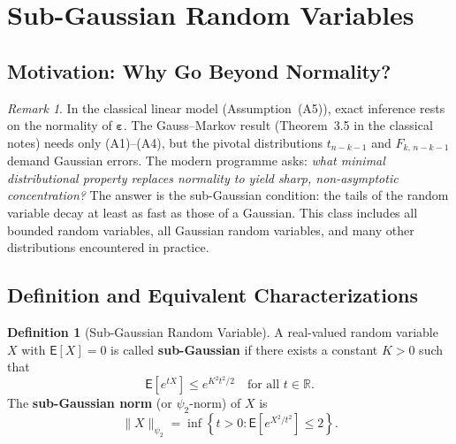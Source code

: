 \documentclass[14pt]{extarticle}
\theoremstyle{plain}
\theoremstyle{definition}
\newtheorem{definition}{Definition}[section]
\theoremstyle{remark}
\newtheorem*{remark}{Remark}
\newcommand\expc{\mathsf{E}}
\newcommand{\be}{\boldsymbol{\varepsilon}}
\newcommand{\Real}{\mathbb{R}}
\begin{document}
\section{Sub-Gaussian Random Variables}\label{sec:subgaussian}

\subsection{Motivation: Why Go Beyond Normality?}

\begin{remark}
In the classical linear model (Assumption~(A5)), exact inference rests on the normality of $\be$. The Gauss--Markov result (Theorem~3.5 in the classical notes) needs only (A1)--(A4), but the pivotal distributions $t_{n-k-1}$ and $F_{k,\,n-k-1}$ demand Gaussian errors. The modern programme asks: \emph{what minimal distributional property replaces normality to yield sharp, non-asymptotic concentration?} The answer is the sub-Gaussian condition: the tails of the random variable decay at least as fast as those of a Gaussian. This class includes all bounded random variables, all Gaussian random variables, and many other distributions encountered in practice.
\end{remark}

\subsection{Definition and Equivalent Characterizations}

\begin{definition}[Sub-Gaussian Random Variable]\label{def:subgaussian}
A real-valued random variable $X$ with $\expc[X] = 0$ is called \textbf{sub-Gaussian} if there exists a constant $K > 0$ such that
\begin{equation}\label{eq:subgaussian-mgf}
\expc\!\left[e^{tX}\right] \leqslant e^{K^2 t^2/2} \quad \text{for all } t \in \Real.
\end{equation}
The \textbf{sub-Gaussian norm} (or $\psi_2$-norm) of $X$ is
\begin{equation}\label{eq:psi2}
\|X\|_{\psi_2} = \inf\!\left\{t > 0 : \expc\!\left[e^{X^2/t^2}\right] \leqslant 2\right\}.
\end{equation}
\end{definition}
\end{document}
